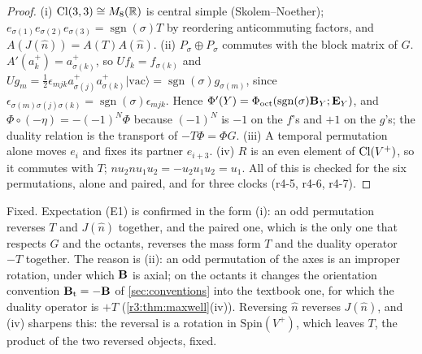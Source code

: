 \begin{proof}
(i) $\mathrm{Cl}(3,3)\cong M_8(\mathbb{R})$ is central simple (Skolem--Noether); $e_{\sigma(1)}e_{\sigma(2)}e_{\sigma(3)}=\operatorname{sgn}(\sigma)T$ by reordering anticommuting factors,
and $A(J(\hat n))=A(T)A(\hat n)$. (ii) $P_\sigma\oplus P_\sigma$ commutes with the block matrix of $G$. $A'(a^+_k)=a^+_{\sigma(k)}$, so $Uf_k=f_{\sigma(k)}$ and
$Ug_m=\tfrac12\epsilon_{mjk}a^+_{\sigma(j)}a^+_{\sigma(k)}|\mathrm{vac}\rangle=\operatorname{sgn}(\sigma)g_{\sigma(m)}$, since $\epsilon_{\sigma(m)\sigma(j)\sigma(k)}=\operatorname{sgn}(\sigma)\epsilon_{mjk}$.
Hence $\Phi'(Y)=\Phi_{\rm oct}(\operatorname{sgn}(\sigma)\mathbf B_Y;\mathbf E_Y)$, and $\Phi\circ(-\eta)=-(-1)^N\Phi$ because $(-1)^N$ is $-1$ on the $f$'s and $+1$ on the $g$'s; the duality
relation is the transport of $-T\Phi=\Phi G$. (iii) A temporal permutation alone moves $e_i$ and fixes its partner $e_{i+3}$. (iv) $R$ is an even
element of $\mathrm{Cl}(V^+)$, so it commutes with $T$; $nu_2nu_1u_2=-u_2u_1u_2=u_1$. All of this is checked for the six permutations, alone and paired, and
for three clocks (r4-5, r4-6, r4-7).
\end{proof}

Fixed. Expectation (E1) is confirmed in the form (i): an odd permutation reverses $T$ and $J(\hat n)$ together, and the paired one, which is
the only one that respects $G$ and the octants, reverses the mass form $T$ and the duality operator $-T$ together. The reason is (ii): an odd
permutation of the axes is an improper rotation, under which $\mathbf B$ is axial; on the octants it changes the orientation convention $\mathbf B_{\rm t}=-\mathbf B$ of \cref{sec:conventions} into the textbook one, for which the duality operator is $+T$ (\cref{r3:thm:maxwell}(iv)). Reversing $\hat n$ reverses $J(\hat n)$, and (iv) sharpens this: the reversal is a rotation in $\mathrm{Spin}(V^+)$, which leaves $T$, the product of the two reversed objects, fixed.

